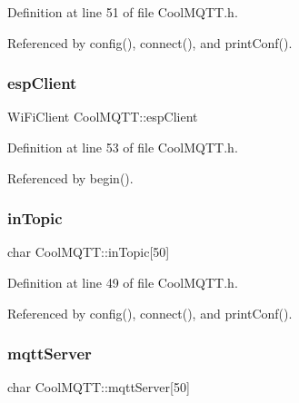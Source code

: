 Definition at line 51 of file Cool\+M\+Q\+T\+T.\+h.



Referenced by config(), connect(), and print\+Conf().

\mbox{\label{classCoolMQTT_acc30a0200967374a524092a8a806502a}} 
\subsubsection{\texorpdfstring{esp\+Client}{espClient}}
{\footnotesize\ttfamily Wi\+Fi\+Client Cool\+M\+Q\+T\+T\+::esp\+Client\hspace{0.3cm}{\ttfamily [private]}}



Definition at line 53 of file Cool\+M\+Q\+T\+T.\+h.



Referenced by begin().

\mbox{\label{classCoolMQTT_a4492f52a441e83cc5151010317fdb52d}} 
\subsubsection{\texorpdfstring{in\+Topic}{inTopic}}
{\footnotesize\ttfamily char Cool\+M\+Q\+T\+T\+::in\+Topic\mbox{[}50\mbox{]}\hspace{0.3cm}{\ttfamily [private]}}



Definition at line 49 of file Cool\+M\+Q\+T\+T.\+h.



Referenced by config(), connect(), and print\+Conf().

\mbox{\label{classCoolMQTT_ab8bb951f87ddbf92db74c2ad16a3e53e}} 
\subsubsection{\texorpdfstring{mqtt\+Server}{mqttServer}}
{\footnotesize\ttfamily char Cool\+M\+Q\+T\+T\+::mqtt\+Server\mbox{[}50\mbox{]}\hspace{0.3cm}{\ttfamily [private]}}



